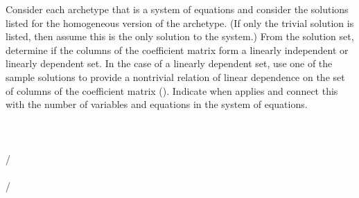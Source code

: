 Consider each archetype that is a system of equations and consider the solutions listed for the homogeneous version of the archetype.  (If only the trivial solution is listed, then assume this is the only solution to the system.)  From the solution set, determine if the columns of the coefficient matrix form a linearly independent or linearly dependent set.  In the case of a linearly dependent set, use one of the sample solutions to provide a nontrivial relation of linear dependence on the set of columns of the coefficient matrix ().  Indicate when  applies and connect this with the number of variables and equations in the system of equations.\\
\\ 
\\ 
\\ 
/\\ 
\\ 
/\\ 
\\

